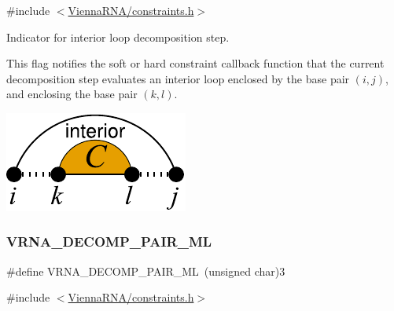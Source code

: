 {\ttfamily \#include $<$\hyperlink{constraints_8h}{Vienna\+R\+N\+A/constraints.\+h}$>$}



Indicator for interior loop decomposition step. 

This flag notifies the soft or hard constraint callback function that the current decomposition step evaluates an interior loop enclosed by the base pair $(i,j)$, and enclosing the base pair $(k,l)$.

 
\begin{DoxyImageNoCaption}
  \mbox{\includegraphics[width=\textwidth,height=\textheight/2,keepaspectratio=true]{decomp_il}}
\end{DoxyImageNoCaption}
 \mbox{\label{group__constraints_gaa15b1185673f0b9e900c4748d45f388f}} 
\subsubsection{\texorpdfstring{V\+R\+N\+A\+\_\+\+D\+E\+C\+O\+M\+P\+\_\+\+P\+A\+I\+R\+\_\+\+ML}{VRNA\_DECOMP\_PAIR\_ML}}
{\footnotesize\ttfamily \#define V\+R\+N\+A\+\_\+\+D\+E\+C\+O\+M\+P\+\_\+\+P\+A\+I\+R\+\_\+\+ML~(unsigned char)3}



{\ttfamily \#include $<$\hyperlink{constraints_8h}{Vienna\+R\+N\+A/constraints.\+h}$>$}



